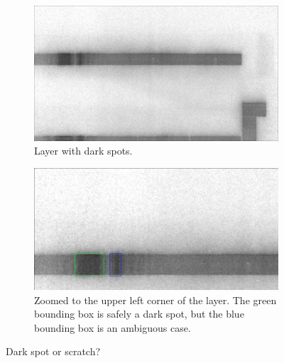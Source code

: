 \begin{figure}[ht]
  \centering

  \begin{subfigure}{\textwidth}
    \includegraphics[width=\textwidth]{images/layer_dark_scratch}
    \caption{Layer with dark spots.}

  \end{subfigure}

  \begin{subfigure}{\textwidth}
    \includegraphics[width=\textwidth]{images/layer_dark_scratch_cropped}
    \caption{Zoomed to the upper left corner of the layer. The green bounding box is safely a dark spot, but the blue bounding box is an ambiguous case.}
  \end{subfigure}

  \caption{Dark spot or scratch?}
  \label{fig:layer_dark_scratch}


\end{figure}
